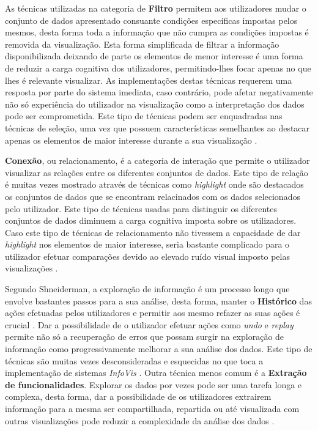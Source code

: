 As técnicas utilizadas na categoria de \textbf{Filtro} permitem aos utilizadores mudar o conjunto de dados apresentado consuante condições específicas impostas pelos mesmos, desta forma toda a informação que não cumpra as condições impostas é removida da visualização. Esta forma simplificada de filtrar a informação disponibilizada deixando de parte os elementos de menor interesse é uma forma de reduzir a carga cognitiva dos utilizadores, permitindo-lhes focar apenas no que lhes é relevante visualizar. As implementações destas técnicas requerem uma resposta por parte do sistema imediata, caso contrário, pode afetar negativamente não só experiência do utilizador na visualização como a interpretação dos dados pode ser comprometida. Este tipo de técnicas podem ser enquadradas nas técnicas de seleção, uma vez que possuem características semelhantes ao destacar apenas os elementos de maior interesse durante a sua visualização \cite{figueiras2015towards, yi2007toward}.

\textbf{Conexão}, ou relacionamento, é a categoria de interação que permite o utilizador visualizar as relações entre os diferentes conjuntos de dados. Este tipo de relação é muitas vezes mostrado através de técnicas como \textit{highlight} onde são destacados os conjuntos de dados que se encontram relacinados com os dados selecionados pelo utilizador. Este tipo de técnicas usadas para distinguir os diferentes conjuntos de dados diminuem a carga cognitiva imposta sobre os utilizadores. Caso este tipo de técnicas de relacionamento não tivessem a capacidade de dar \textit{highlight} nos elementos de maior interesse, seria bastante complicado para o utilizador efetuar comparações devido ao elevado ruído visual imposto pelas visualizações \cite{figueiras2015towards}.

Segundo Shneiderman, a exploração de informação é um processo longo que envolve bastantes passos para a sua análise, desta forma, manter o \textbf{Histórico} das ações efetuadas pelos utilizadores e permitir aos mesmo refazer as suas ações é crucial \cite{heer2012interactive}. Dar a possibilidade de o utilizador efetuar ações como \textit{undo} e \textit{replay} permite não só a recuperação de erros que possam surgir na exploração de informação como progressivamente melhorar a sua análise dos dados. Este tipo de técnicas são muitas vezes desconsideradas e esquecidas no que toca a implementação de sistemas \textit{InfoVis} \cite{figueiras2015towards}. Outra técnica menos comum é a \textbf{Extração de funcionalidades}. Explorar os dados por vezes pode ser uma tarefa longa e complexa, desta forma, dar a possibilidade de os utilizadores extrairem informação para a mesma ser compartilhada, repartida ou até visualizada com outras visualizações pode reduzir a complexidade da análise dos dados \cite{figueiras2015towards, heer2012interactive}.

